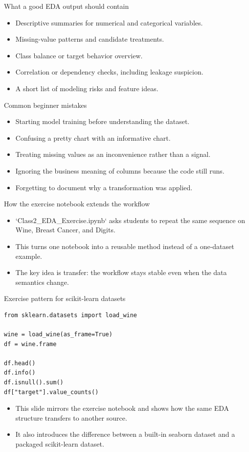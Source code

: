 \begin{frame}{What a good EDA output should contain}
\begin{itemize}
\item Descriptive summaries for numerical and categorical variables.
\item Missing-value patterns and candidate treatments.
\item Class balance or target behavior overview.
\item Correlation or dependency checks, including leakage suspicion.
\item A short list of modeling risks and feature ideas.
\end{itemize}
\coursefooter
\end{frame}

\begin{frame}{Common beginner mistakes}
\begin{itemize}
\item Starting model training before understanding the dataset.
\item Confusing a pretty chart with an informative chart.
\item Treating missing values as an inconvenience rather than a signal.
\item Ignoring the business meaning of columns because the code still runs.
\item Forgetting to document why a transformation was applied.
\end{itemize}
\coursefooter
\end{frame}

\begin{frame}{How the exercise notebook extends the workflow}
\begin{itemize}
\item `Class2_EDA_Exercise.ipynb` asks students to repeat the same sequence on Wine, Breast Cancer, and Digits.
\item This turns one notebook into a reusable method instead of a one-dataset example.
\item The key idea is transfer: the workflow stays stable even when the data semantics change.
\end{itemize}
\coursefooter
\end{frame}

\begin{frame}[fragile]{Exercise pattern for scikit-learn datasets}
\begin{lstlisting}[style=coursepython]
from sklearn.datasets import load_wine

wine = load_wine(as_frame=True)
df = wine.frame

df.head()
df.info()
df.isnull().sum()
df["target"].value_counts()
\end{lstlisting}
\begin{itemize}
\item This slide mirrors the exercise notebook and shows how the same EDA structure transfers to another source.
\item It also introduces the difference between a built-in seaborn dataset and a packaged scikit-learn dataset.
\end{itemize}
\coursefooter
\end{frame}

